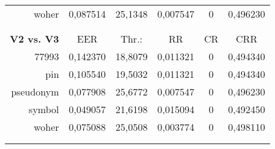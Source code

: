 \begin{table}[htbp]
\begin{tabular}{rrrrrr}
    woher & \multicolumn{1}{c}{0,087514} & \multicolumn{1}{c}{25,1348} & \multicolumn{1}{c}{0,007547} & \multicolumn{1}{c}{0} & \multicolumn{1}{c}{0,496230} \\
          &       &       &       &       &  \\
          &       &       &       &       &  \\
    \textbf{V2 vs. V3} & \multicolumn{1}{c}{EER} & \multicolumn{1}{c}{Thr.:} & \multicolumn{1}{c}{RR} & \multicolumn{1}{c}{CR} & \multicolumn{1}{c}{CRR} \\
    77993 & \multicolumn{1}{c}{0,142370} & \multicolumn{1}{c}{18,8079} & \multicolumn{1}{c}{0,011321} & \multicolumn{1}{c}{0} & \multicolumn{1}{c}{0,494340} \\
    pin   & \multicolumn{1}{c}{0,105540} & \multicolumn{1}{c}{19,5032} & \multicolumn{1}{c}{0,011321} & \multicolumn{1}{c}{0} & \multicolumn{1}{c}{0,494340} \\
    pseudonym & \multicolumn{1}{c}{0,077908} & \multicolumn{1}{c}{25,6772} & \multicolumn{1}{c}{0,007547} & \multicolumn{1}{c}{0} & \multicolumn{1}{c}{0,496230} \\
    symbol & \multicolumn{1}{c}{0,049057} & \multicolumn{1}{c}{21,6198} & \multicolumn{1}{c}{0,015094} & \multicolumn{1}{c}{0} & \multicolumn{1}{c}{0,492450} \\
    woher & \multicolumn{1}{c}{0,075088} & \multicolumn{1}{c}{25,0508} & \multicolumn{1}{c}{0,003774} & \multicolumn{1}{c}{0} & \multicolumn{1}{c}{0,498110} \\
          &       &       &       &       &  \\
          &       &       &       &       &  \\
    \bottomrule
    \end{tabular}%
  \label{tab:verifikation}%
\end{table}%

